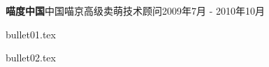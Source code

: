 \begin{rProject}{\bf 喵度中国}{中国喵京}{高级卖萌技术顾问}{2009年7月 - 2010年10月 }
    \item {bullet01.tex}
    \item {bullet02.tex}
\end{rProject}
